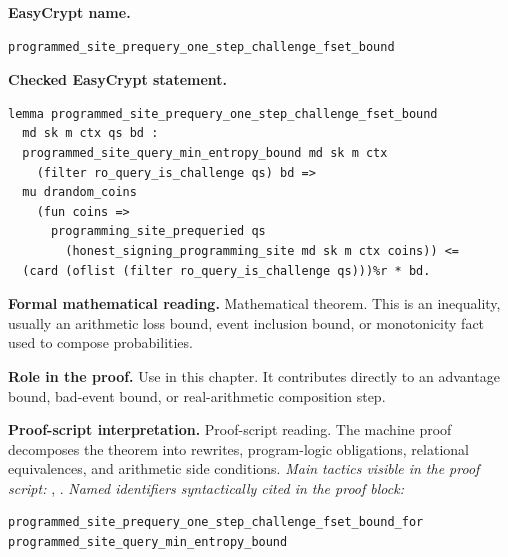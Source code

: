 \begin{formaltheorem}
\noindent\textbf{EasyCrypt name.}
\begin{lstlisting}[language=EasyCrypt,basicstyle=\ttfamily\scriptsize]
programmed_site_prequery_one_step_challenge_fset_bound
\end{lstlisting}
\noindent\textbf{Checked EasyCrypt statement.}
\begin{lstlisting}[language=EasyCrypt,basicstyle=\ttfamily\scriptsize]
lemma programmed_site_prequery_one_step_challenge_fset_bound
  md sk m ctx qs bd :
  programmed_site_query_min_entropy_bound md sk m ctx
    (filter ro_query_is_challenge qs) bd =>
  mu drandom_coins
    (fun coins =>
      programming_site_prequeried qs
        (honest_signing_programming_site md sk m ctx coins)) <=
  (card (oflist (filter ro_query_is_challenge qs)))%r * bd.
\end{lstlisting}
\noindent\textbf{Formal mathematical reading.}
Mathematical theorem. This is an inequality, usually an arithmetic loss bound, event inclusion bound, or monotonicity fact used to compose probabilities.

\noindent\textbf{Role in the proof.}
Use in this chapter. It contributes directly to an advantage bound, bad-event bound, or real-arithmetic composition step.

\noindent\textbf{Proof-script interpretation.}
Proof-script reading. The machine proof decomposes the theorem into rewrites, program-logic obligations, relational equivalences, and arithmetic side conditions.
\emph{Main tactics visible in the proof script:} , .
\emph{Named identifiers syntactically cited in the proof block:}
\begin{lstlisting}[language=EasyCrypt,basicstyle=\ttfamily\scriptsize]
programmed_site_prequery_one_step_challenge_fset_bound_for
programmed_site_query_min_entropy_bound
\end{lstlisting}

\end{formaltheorem}

